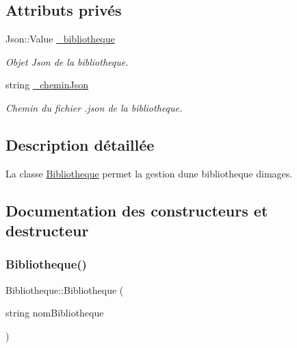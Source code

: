 \subsection*{Attributs privés}
\begin{DoxyCompactItemize}
\item 
\mbox{\label{classBibliotheque_a15a693b9eedd442d0cc00489b5ea6e5e}} 
Json\+::\+Value \hyperlink{classBibliotheque_a15a693b9eedd442d0cc00489b5ea6e5e}{\+\_\+bibliotheque}
\begin{DoxyCompactList}\small\item\em Objet Json de la bibliotheque. \end{DoxyCompactList}\item 
\mbox{\label{classBibliotheque_a9628b7dc59bbb3894c17634addc8016a}} 
string \hyperlink{classBibliotheque_a9628b7dc59bbb3894c17634addc8016a}{\+\_\+chemin\+Json}
\begin{DoxyCompactList}\small\item\em Chemin du fichier .json de la bibliotheque. \end{DoxyCompactList}\end{DoxyCompactItemize}


\subsection{Description détaillée}
La classe \hyperlink{classBibliotheque}{Bibliotheque} permet la gestion d\textquotesingle{}une bibliotheque d\textquotesingle{}images. 

\subsection{Documentation des constructeurs et destructeur}
\mbox{\label{classBibliotheque_ac18f721f99ed6699547099e554af08fe}} 
\subsubsection{\texorpdfstring{Bibliotheque()}{Bibliotheque()}\hspace{0.1cm}{\footnotesize\ttfamily [1/2]}}
{\footnotesize\ttfamily Bibliotheque\+::\+Bibliotheque (\begin{DoxyParamCaption}\item[{string}]{nom\+Bibliotheque }\end{DoxyParamCaption})}



